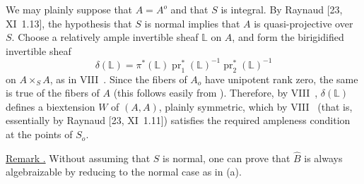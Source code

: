 We may plainly suppose that $A=A^o$ and that $S$ is integral.  By
Raynaud [23, XI~1.13], the hypothesis that $S$ is normal implies that
$A$ is quasi-projective over $S$.  Choose a relatively ample
invertible sheaf $\mathbb L$ on $A$, and form the birigidified
invertible sheaf
\[
 \delta(\mathbb L)=
 \pi^*(\mathbb L)\operatorname{pr}_1^*(\mathbb L)^{-1}
 \operatorname{pr}_2^*(\mathbb L)^{-1}
\]
on $A\times_S A$, as in VIII~.  Since the fibers of $A_o$ have
unipotent rank zero, the same is true of the fibers of $A$ (this
follows easily from ).  Therefore, by VIII~,
$\delta(\mathbb L)$ defines a biextension $W$ of $(A,A)$, plainly
symmetric, which by VIII~ (that is, essentially by Raynaud
[23, XI~1.11]) satisfies the required ampleness condition at the
points of $S_o$.

\medskip
\noindent
\underline{Remark .} Without assuming that $S$ is normal, one
can prove that $\widehat B$ is always algebraizable by reducing to the
normal case as in (a).
